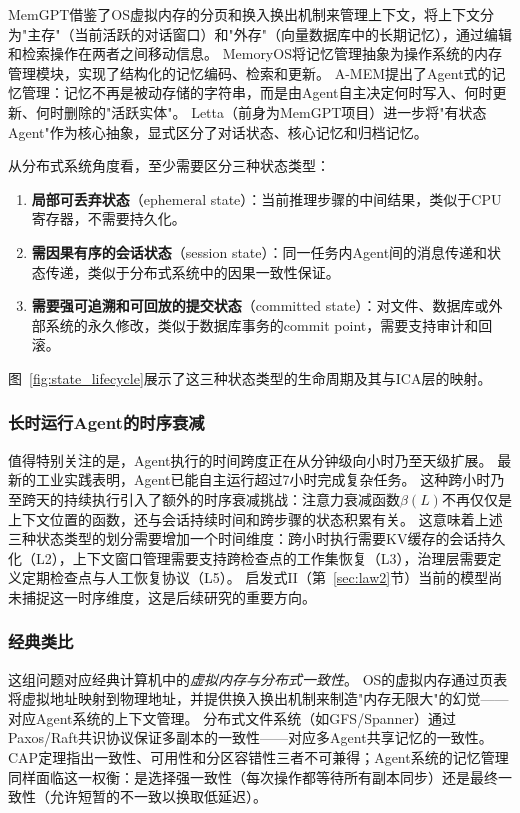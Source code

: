 MemGPT\cite{memgpt2023}借鉴了OS虚拟内存的分页和换入换出机制来管理上下文，将上下文分为"主存"（当前活跃的对话窗口）和"外存"（向量数据库中的长期记忆），通过编辑和检索操作在两者之间移动信息。
MemoryOS\cite{memoryos2025}将记忆管理抽象为操作系统的内存管理模块，实现了结构化的记忆编码、检索和更新。
A-MEM\cite{amem2025}提出了Agent式的记忆管理：记忆不再是被动存储的字符串，而是由Agent自主决定何时写入、何时更新、何时删除的"活跃实体"。
Letta\cite{letta_stateful_2026}（前身为MemGPT项目）进一步将"有状态Agent"作为核心抽象，显式区分了对话状态、核心记忆和归档记忆。

从分布式系统角度看，至少需要区分三种状态类型\cite{raft2014,spanner2012,cap2002}：
\begin{enumerate}[nosep]
\item \textbf{局部可丢弃状态}（ephemeral state）：当前推理步骤的中间结果，类似于CPU寄存器，不需要持久化。
\item \textbf{需因果有序的会话状态}（session state）：同一任务内Agent间的消息传递和状态传递，类似于分布式系统中的因果一致性保证\cite{raft2014}。
\item \textbf{需要强可追溯和可回放的提交状态}（committed state）：对文件、数据库或外部系统的永久修改，类似于数据库事务的commit point，需要支持审计和回滚\cite{spanner2012}。
\end{enumerate}

图~\ref{fig:state_lifecycle}展示了这三种状态类型的生命周期及其与ICA层的映射。


\subsubsection{长时运行Agent的时序衰减}
值得特别关注的是，Agent执行的时间跨度正在从分钟级向小时乃至天级扩展。
最新的工业实践表明，Agent已能自主运行超过7小时完成复杂任务\cite{anthropic2026agenticreport}。
这种跨小时乃至跨天的持续执行引入了额外的时序衰减挑战：注意力衰减函数$\beta(L)$不再仅仅是上下文位置的函数，还与会话持续时间和跨步骤的状态积累有关。
这意味着上述三种状态类型的划分需要增加一个时间维度：跨小时执行需要KV缓存的会话持久化（L2），上下文窗口管理需要支持跨检查点的工作集恢复（L3），治理层需要定义定期检查点与人工恢复协议（L5）。
启发式II（第~\ref{sec:law2}节）当前的模型尚未捕捉这一时序维度，这是后续研究的重要方向。

\subsubsection{经典类比}
这组问题对应经典计算机中的\emph{虚拟内存与分布式一致性}。
OS的虚拟内存通过页表将虚拟地址映射到物理地址，并提供换入换出机制来制造"内存无限大"的幻觉——对应Agent系统的上下文管理。
分布式文件系统（如GFS/Spanner\cite{spanner2012}）通过Paxos/Raft\cite{raft2014}共识协议保证多副本的一致性——对应多Agent共享记忆的一致性。
CAP定理\cite{cap2002}指出一致性、可用性和分区容错性三者不可兼得；Agent系统的记忆管理同样面临这一权衡：是选择强一致性（每次操作都等待所有副本同步）还是最终一致性（允许短暂的不一致以换取低延迟）。

